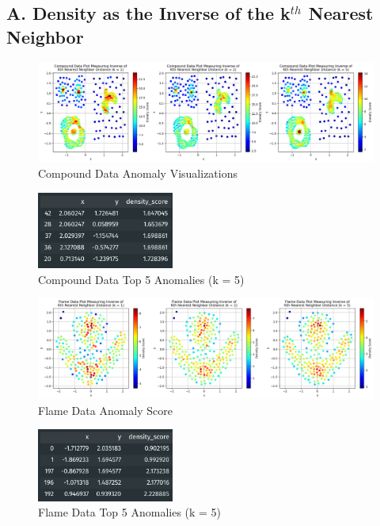 \documentclass{article}
\begin{document}
\subsection{A. Density as the Inverse of the k$^{th}$ Nearest Neighbor}
\begin{figure}[H]
    \centering
    \includegraphics[width=\textwidth]{p3_p1a.png}
    \caption{Compound Data Anomaly Visualizations}
\end{figure}
\begin{figure}[H]
    \centering
    \includegraphics[width=0.4\textwidth]{p3_d1a.png}
    \caption{Compound Data Top 5 Anomalies (k = 5)}
\end{figure}

\begin{figure}[H]
    \centering
    \includegraphics[width=\textwidth]{p3_p2a.png}
    \caption{Flame Data Anomaly Score}
\end{figure}
\begin{figure}[H]
    \centering
    \includegraphics[width=0.4\textwidth]{p3_d2a.png}
    \caption{Flame Data Top 5 Anomalies (k = 5)}
\end{figure}
\end{document}
